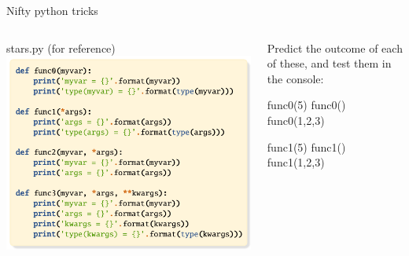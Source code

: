 \documentclass[aspectratio=169] {beamer}
\begin{document}
\begin{frame}[fragile,t]{ Nifty python tricks}

  \begin{columns}
    \begin{column}[t]{.58\textwidth}
      stars.py (for reference)
      \includegraphics[scale=.85]{stars.pdf}
    \end{column}
   
    \begin{column}[t]{.38\textwidth}
      Predict the outcome of each of these, 
      and test them in the console:
      \begin{pythoncode}
        func0(5)
        func0()
        func0(1,2,3)	
      \end{pythoncode}
  
      \pause
      \begin{pythoncode}
        func1(5)
        func1()
        func1(1,2,3)	
      \end{pythoncode}
    \end{column}
  \end{columns}

\end{frame}
\end{document}
